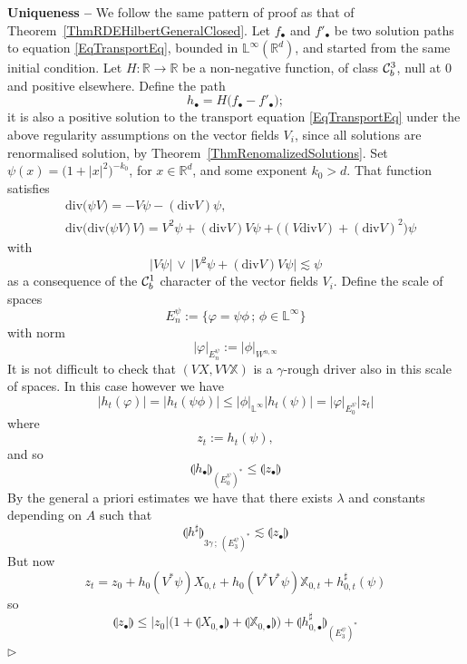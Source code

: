 \documentclass[11pt,a4paper]{amsart}
\newcommand{\RR}{\mathbb{R}}  \newcommand{\CC}{\mathbb{C}}  \newcommand{\LL}{\mathbb{L}}  \newcommand{\WW}{\mathbb{W}}
\renewcommand{\leq}{\leqslant}
\numberwithin{equation}{section} %
\newenvironment{Dem}{%
    \begin{list}{\hspace{0.5cm}{\sc Proof --}}{%
        \setlength{\topsep}{0pt}%
        \setlength{\leftmargin}{0pt}%
        \setlength{\rightmargin}{0pt}%
        \setlength{\listparindent}{0pt}%
        \setlength{\itemindent}{0pt}%
        \setlength{\parsep}{0pt}%
        \addtolength{\leftmargin}{20pt}%
        \addtolength{\rightmargin}{0pt}%
    } \item }{\hfill{\space $\rhd$}\end{list}\smallskip}
\begin{document}
\begin{Dem}
{\bf Uniqueness --} We follow the same pattern of proof as that of Theorem~\ref{ThmRDEHilbertGeneralClosed}. Let $f_\bullet$ and $f'_\bullet$ be two solution paths to equation \eqref{EqTransportEq}, bounded in $\LL^\infty(\RR^d)$, and started from the same initial condition. Let $H : \RR\rightarrow\RR$ be a non-negative function, of class $\mathcal{C}^3_b$, null at $0$ and positive elsewhere. Define the path 
$$
h_\bullet = H\big(f_\bullet - f'_\bullet\big);
$$
it is also a positive solution to the transport equation \eqref{EqTransportEq} under the above regularity assumptions on the vector fields $V_i$, since all solutions are renormalised solution, by Theorem~\ref{ThmRenomalizedSolutions}. Set $\psi(x) = \big(1+|x|^2\big)^{-k_0}$, for $x\in\RR^d$, and some exponent $k_0>d$. That function satisfies 
\begin{equation*}
\begin{split}
&\textrm{div}\big(\psi V\big) = -V\psi - (\textrm{div}V)\psi, \\
&\textrm{div}\Big(\textrm{div}\big(\psi V\big)\,V\Big) = V^2\psi + (\textrm{div}V)V\psi + \big((V\textrm{div}V)+(\textrm{div}V)^2\big)\psi  
\end{split}
\end{equation*}
with 
\begin{equation*}
\Big|V\psi\Big| \,\vee\, \Big|V^2\psi + (\textrm{div}V)V\psi\Big| \lesssim \psi
\end{equation*}
as a consequence of the $\mathcal{C}^1_b$ character of the vector fields $V_i$. 
Define the scale of spaces 
$$
E_n^\psi := \big\{\varphi = \psi \phi\,;\,\phi \in \LL^\infty\big\} 
$$
with norm 
$$
|\varphi|_{E_n^\psi} := |\phi|_{W^{n,\infty}}
$$ 
It is not difficult to check that $(V X, VV \mathbb{X})$ is a $\gamma$-rough driver also in this scale of spaces. In this case however we have
$$
\big|h_t(\varphi)\big| = \big|h_t ( \psi \phi)\big| \leq |\phi|_{\LL^\infty} \big|h_t( \psi)\big| = |\varphi|_{E^\psi_0}\big|z_t\big|
$$
where 
$$
z_t := h_t(\psi), 
$$
and so
$$
\llparenthesis h_\bullet\rrparenthesis_{(E_0^\psi)^*}\leq \llparenthesis z_\bullet \rrparenthesis
$$
By the general a priori estimates we have that there exists $\lambda$ and constants depending on $A$ such that
$$
\llparenthesis h^\sharp \rrparenthesis_{3\gamma\,;\,(E_3^\psi)^*} \lesssim \llparenthesis z_\bullet \rrparenthesis
$$
But now
$$
z_t = z_0 +  h_{0}(V^* \psi)X_{0,t}+  h_{0}(V^*V^* \psi)\mathbb{X}_{0,t} + h^\sharp_{0,t}(\psi)
$$
so
$$
\llparenthesis z_\bullet \rrparenthesis \leq |z_0| \big(1+ \llparenthesis X_{0, \bullet} \rrparenthesis+ \llparenthesis \mathbb{X}_{0,\bullet} \rrparenthesis\big) + \llparenthesis h^\sharp_{0,\bullet} \rrparenthesis_{(E_3^\psi)^*}
$$
\end{Dem}
\end{document}
